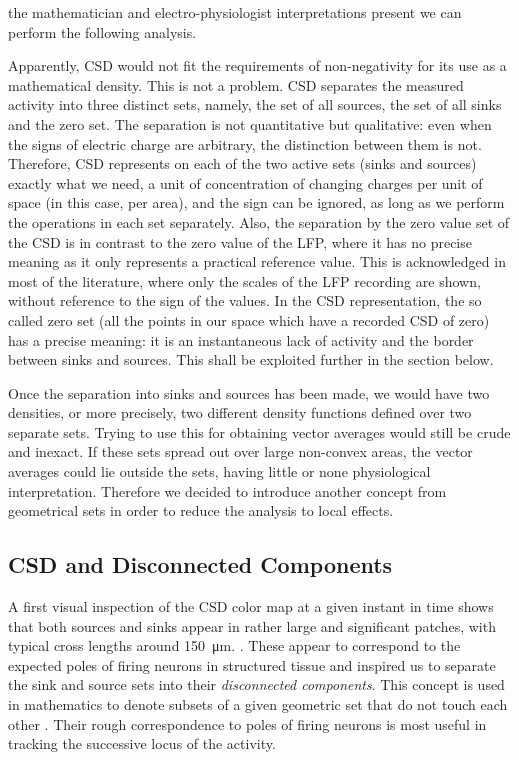 \documentclass[11pt, letterpaper]{article}
\newcommand{\mum}[1]{\SI{#1}{\micro\metre}}
\begin{document}
the mathematician and electro-physiologist interpretations present we can
perform the following analysis.

Apparently, CSD would not fit the requirements of non-negativity for its use as a mathematical density. This is not a problem.  CSD separates the measured activity into three distinct sets, namely, the set of all sources, the set of all sinks and the zero set. The separation is not quantitative but qualitative: even when the signs of electric charge are arbitrary, the distinction between them is not. Therefore, CSD represents on each of the two active sets (sinks and sources) exactly what we need, a unit of concentration of changing charges per unit of space (in this case, per area), and the sign can be ignored, as long as we perform the operations in each set separately. Also, the separation by the zero value set of the CSD is in contrast to the zero value of the LFP, where it has no precise meaning as it only represents a practical reference value. This is acknowledged in most of the literature, where only the scales of the LFP recording are shown, without reference to the sign of the values. In the CSD representation,  the so called zero set (all the points in our space which have a recorded CSD of zero)  has a precise meaning: it is an instantaneous lack of activity and the border between sinks and sources. This shall be exploited further in the section below.

Once the separation into sinks and sources has been made, we would have two densities, or more precisely, two different density functions defined over two separate sets. Trying to use this for obtaining vector averages would still be crude and inexact. If these sets spread out over large non-convex areas, the vector averages could lie outside the sets, having little or none physiological interpretation. Therefore we decided to introduce another concept from geometrical sets in order to reduce the analysis to local effects.


\subsection{CSD and Disconnected Components}

A first visual inspection of the CSD color map at a given instant in time shows that both sources and sinks appear in rather large and significant patches, with typical
cross lengths around \mum{150}. .
These appear to correspond to the expected poles of firing neurons in structured tissue \cite{Buzsaki2012} and inspired us to separate the sink and source  sets into their \emph{disconnected components}. This concept is used in mathematics to denote subsets of a given geometric set that do not touch each other  \cite{Halmos}. Their rough correspondence to poles of firing neurons is most useful in tracking the successive locus of the activity.
\end{document}

